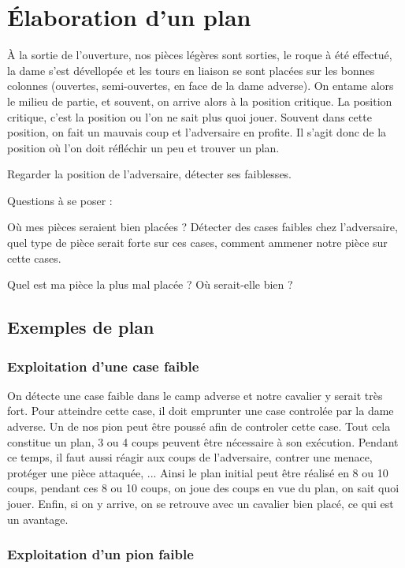 
\section{Élaboration d'un plan}

À la sortie de l'ouverture, nos pièces légères sont sorties, le roque à été effectué, la dame s'est dévellopée et les tours en liaison se sont placées sur les bonnes colonnes (ouvertes, semi-ouvertes, en face de la dame adverse). On entame alors le milieu de partie, et souvent, on arrive alors à la position critique. La position critique, c'est la position ou l'on ne sait plus quoi jouer. Souvent dans cette position, on fait un mauvais coup et l'adversaire en profite. Il s'agit donc de la position où l'on doit réfléchir un peu et trouver un plan.

Regarder la position de l'adversaire, détecter ses faiblesses.

Questions à se poser :

Où mes pièces seraient bien placées ? Détecter des cases faibles chez l'adversaire, quel type de pièce serait forte sur ces cases, comment ammener notre pièce sur cette cases.

Quel est ma pièce la plus mal placée ? Où serait-elle bien ?


\subsection{Exemples de plan}



\subsubsection{Exploitation d'une case faible}

On détecte une case faible dans le camp adverse et notre cavalier y serait très fort. Pour atteindre cette case,  il doit emprunter une case controlée par la dame adverse. Un de nos pion peut être poussé afin de controler cette case. Tout cela constitue un plan, 3 ou 4 coups peuvent être nécessaire à son exécution. Pendant ce temps, il faut aussi réagir aux coups de l'adversaire, contrer une menace, protéger une pièce attaquée, ... Ainsi le plan initial peut être réalisé en 8 ou 10 coups, pendant ces 8 ou 10 coups, on joue des coups en vue du plan, on sait quoi jouer. Enfin, si on y arrive, on se retrouve avec un cavalier bien placé, ce qui est un avantage.

\subsubsection{Exploitation d'un pion faible}




